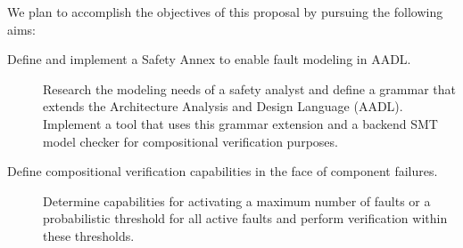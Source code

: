 We plan to accomplish the objectives of this proposal by pursuing the following aims:

\begin{description}
\item[Define and implement a Safety Annex to enable fault modeling in AADL.] Research the modeling needs of a safety analyst and define a grammar that extends the Architecture Analysis and Design Language (AADL). Implement a tool that uses this grammar extension and a backend SMT model checker for compositional verification purposes.


\item[Define compositional verification capabilities in the face of component failures.] Determine capabilities for activating a maximum number of faults or a probabilistic threshold for all active faults and perform verification within these thresholds.



\end{description}
